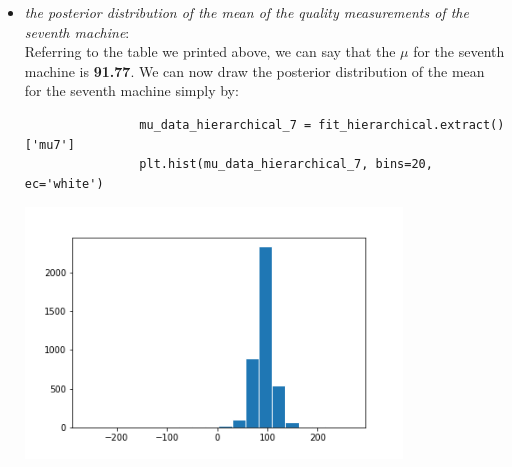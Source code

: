 \documentclass[11pt,a4paper,english]{article}
\begin{document}
\begin{itemize}
            \item \textit{the posterior distribution of the mean of the quality measurements of the seventh machine}: \\
              Referring to the table we printed above, we can say that the $\mu$ for the seventh machine is \textbf{91.77}. We can now draw the posterior distribution of the mean for the seventh machine simply by:
              \begin{verbatim}
                mu_data_hierarchical_7 = fit_hierarchical.extract()['mu7']
                plt.hist(mu_data_hierarchical_7, bins=20, ec='white')
              \end{verbatim}
              \begin{center}
                \includegraphics[width=10cm]{hierarchical_hist_mu_7.png}
              \end{center}
          \end{itemize}
\end{document}
